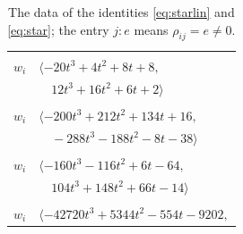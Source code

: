 \documentclass[11pt]{article}
\begin{document}
\begingroup\scriptsize
\setlength{\LTcapwidth}{\textwidth}
\begin{longtable}{@{}ll@{}}
\caption{The data of the identities \eqref{eq:starlin} and \eqref{eq:star}; the entry $j{:}e$ means $\rho_{ij}=e\neq0$.}\label{tab:star}\\
\hline\endfirsthead\hline\endhead\hline\endfoot
\multicolumn{2}{@{}p{0.97\textwidth}@{}}{$i=0$, $D_i=4$, $\rho_{ij}$: $5{:}1, \allowbreak 6{:}2, \allowbreak 9{:}1, \allowbreak 15{:}1, \allowbreak 29{:}2, \allowbreak 38{:}1, \allowbreak 41{:}2, \allowbreak 44{:}1, \allowbreak 46{:}2, \allowbreak 47{:}1, \allowbreak 50{:}1$}\\
$w_i$ & $\langle -20t^{3}+4t^{2}+8t+8,$\\
 & $\quad 12t^{3}+16t^{2}+6t+2\rangle$\\
\addlinespace[2pt]
\multicolumn{2}{@{}p{0.97\textwidth}@{}}{$i=1$, $D_i=16$, $\rho_{ij}$: $3{:}1, \allowbreak 7{:}1, \allowbreak 8{:}1, \allowbreak 11{:}2, \allowbreak 12{:}2, \allowbreak 14{:}1, \allowbreak 15{:}1, \allowbreak 16{:}1, \allowbreak 21{:}1, \allowbreak 22{:}1, \allowbreak 24{:}2, \allowbreak 35{:}1, \allowbreak 41{:}1, \allowbreak 42{:}2, \allowbreak 43{:}2, \allowbreak 44{:}2, \allowbreak 46{:}2, \allowbreak 48{:}1, \allowbreak 50{:}2$}\\
$w_i$ & $\langle -200t^{3}+212t^{2}+134t+16,$\\
 & $\quad -288t^{3}-188t^{2}-8t-38\rangle$\\
\addlinespace[2pt]
\multicolumn{2}{@{}p{0.97\textwidth}@{}}{$i=2$, $D_i=16$, $\rho_{ij}$: $3{:}2, \allowbreak 12{:}2, \allowbreak 13{:}2, \allowbreak 14{:}2, \allowbreak 16{:}1, \allowbreak 20{:}2, \allowbreak 23{:}2, \allowbreak 24{:}1, \allowbreak 26{:}2, \allowbreak 27{:}2, \allowbreak 38{:}2, \allowbreak 43{:}2, \allowbreak 44{:}2, \allowbreak 45{:}1, \allowbreak 50{:}2$}\\
$w_i$ & $\langle -160t^{3}-116t^{2}+6t-64,$\\
 & $\quad 104t^{3}+148t^{2}+66t-14\rangle$\\
\addlinespace[2pt]
\multicolumn{2}{@{}p{0.97\textwidth}@{}}{$i=3$, $D_i=8$, $\rho_{ij}$: $1{:}2, \allowbreak 2{:}1, \allowbreak 9{:}1, \allowbreak 10{:}1, \allowbreak 14{:}1, \allowbreak 16{:}1, \allowbreak 18{:}1, \allowbreak 21{:}1, \allowbreak 22{:}2, \allowbreak 26{:}1, \allowbreak 30{:}1, \allowbreak 32{:}2, \allowbreak 35{:}2, \allowbreak 43{:}2, \allowbreak 46{:}1, \allowbreak 49{:}2$}\\
$w_i$ & $\langle -42720t^{3}+5344t^{2}-554t-9202,$\\

\end{longtable}
\end{document}

